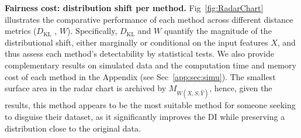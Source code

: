 \documentclass[runningheads, orivec]{llncs}
\newcommand{\KL}{D_{\mathrm{KL}}}
\begin{document}
\textbf{Fairness cost: distribution shift per method.} Fig~\ref{fig:RadarChart} illustrates the comparative performance of each method across different distance metrics ($\displaystyle \KL$ , $W $). 
Specifically, $\displaystyle \KL$ and $W$ quantify the magnitude of the distributional shift, either marginally or conditional on the input features $X$, and thus assess each method’s detectability by statistical tests.
We also provide complementary results on simulated data and the computation time and memory cost of each method in the Appendix (see Sec~\ref{app:sec:simu}).
The smallest surface area in the radar chart is archived by \texttt{$M_{W(X,S,\widehat{Y})}$}, hence, given the results, this method appears to be the most suitable method for someone seeking to disguise their dataset, as it significantly improves the DI while preserving a distribution close to the original data. %
\end{document}
